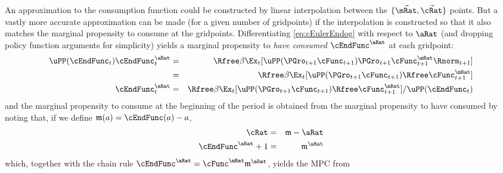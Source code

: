 \documentclass[./BufferStockTheory.tex]{subfiles}
\begin{document}
An approximation to the consumption function could be constructed by
linear interpolation between the $\{\vec{\mRat},\vec{\cRat}\}$ points.
But a vastly more accurate approximation can be made (for a given
number of gridpoints) if the interpolation is constructed so that it
also matches the marginal propensity to consume at the gridpoints. Differentiating \eqref{eq:cEulerEndog}
with respect to $\aRat$ (and dropping policy function arguments for
simplicity) yields a marginal propensity to {\it have consumed} $\cEndFunc^{\aRat}$ at
each gridpoint:
\begin{eqnarray}
\uPP(\cEndFunc_{t})\cEndFunc_{t}^{\aRat} & = & \Rfree \beta \Ex_{t}[\uPP(\PGro_{t+1} \cFunc_{t+1})\PGro_{t+1} \cFunc^{\mRat}_{t+1}\Rnorm_{t+1}] \notag
\\ & = & \Rfree \beta \Ex_{t}[\uPP(\PGro_{t+1} \cFunc_{t+1}) \Rfree \cFunc^{\mRat}_{t+1}] \notag
\\ \cEndFunc_{t}^{\aRat} & = & \Rfree \beta \Ex_{t}[\uPP(\PGro_{t+1}  \cFunc_{t+1}) \Rfree \cFunc^{\mRat}_{t+1}]/\uPP(\cEndFunc_{t}) \label{eq:MPTHC}
\end{eqnarray}
and the marginal propensity to consume at the beginning of the period is obtained from the marginal
propensity to have consumed by noting that, if we define $\mathfrak{m}(a) = \cEndFunc(a)-a$,
\begin{eqnarray*}
   \cRat & = & \mathfrak{m}-\aRat
\\ \cEndFunc^{\aRat}+1 & = & \mathfrak{m}^{\aRat}
\end{eqnarray*}
which, together with the chain rule $\cEndFunc^{\aRat}  = \cFunc^{\mRat}\mathfrak{m}^{\aRat}$,
yields the MPC from
\end{document}
